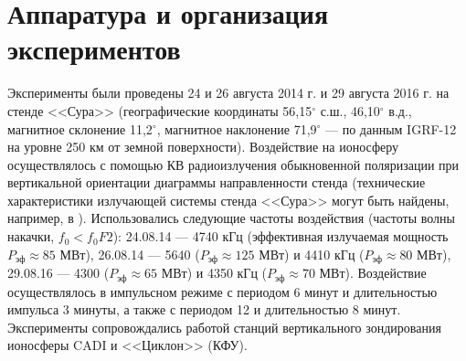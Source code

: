 \documentclass[12pt,a4paper]{article}
\begin{document}
\section{Аппаратура и организация экспериментов} \label{sec:exp_setup}
Эксперименты были проведены 24 и 26 августа 2014 г. и 29 августа 2016 г. на стенде <<Сура>> (географические координаты 56,15$^{\circ}$ с.ш., 46,10$^{\circ}$ в.д., магнитное склонение 11,2$^{\circ}$, магнитное наклонение 71,9$^{\circ}$ --- по данным IGRF-12 \cite{Thebault2015} на уровне 250 км от земной поверхности). Воздействие на ионосферу осуществлялось с помощью КВ радиоизлучения обыкновенной поляризации при вертикальной ориентации диаграммы направленности стенда (технические характеристики излучающей системы стенда <<Сура>> могут быть найдены, например, в \cite{BERNHARDTSCALESGRACHEtAl1991}). Использовались следующие частоты воздействия (частоты волны накачки, $f_0<f_{0}F2$): 24.08.14 --- 4740 кГц (эффективная излучаемая мощность $P_{\text{эф}} \approx 85$ МВт), 26.08.14 --- 5640 ($P_{\text{эф}} \approx 125$ МВт) и 4410 кГц ($P_{\text{эф}} \approx 80$ МВт), 29.08.16 --- 4300 ($P_{\text{эф}} \approx 65$ МВт) и 4350 кГц ($P_{\text{эф}} \approx 70$ МВт). Воздействие осуществлялось в импульсном режиме с периодом 6 минут и длительностью импульса 3 минуты, а также с периодом 12 и длительностью 8 минут. Эксперименты сопровождались работой станций вертикального зондирования ионосферы CADI \cite{CADI_specs} и <<Циклон>> (КФУ).
\end{document}
